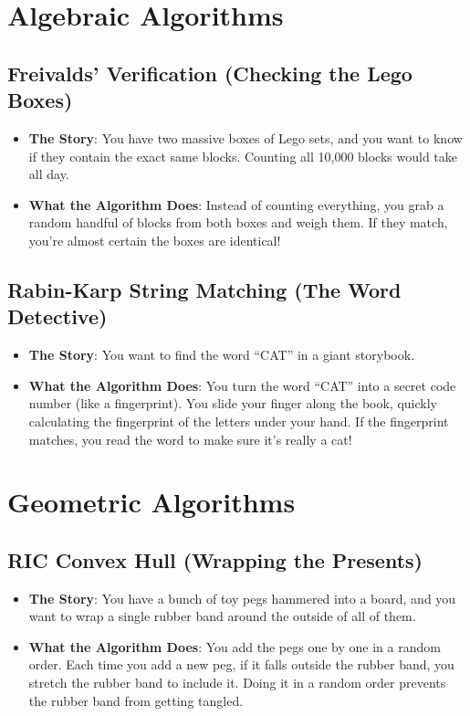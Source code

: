 \documentclass[twoside,12pt]{book}
\theoremstyle{plain}
\theoremstyle{definition}
\theoremstyle{remark}
\begin{document}
\section{Algebraic Algorithms}

\subsection{Freivalds' Verification (Checking the Lego Boxes)}
\begin{itemize}
    \item \textbf{The Story}: You have two massive boxes of Lego sets, and you want to know if they contain the exact same blocks. Counting all 10,000 blocks would take all day.
    \item \textbf{What the Algorithm Does}: Instead of counting everything, you grab a random handful of blocks from both boxes and weigh them. If they match, you're almost certain the boxes are identical!
\end{itemize}

\subsection{Rabin-Karp String Matching (The Word Detective)}
\begin{itemize}
    \item \textbf{The Story}: You want to find the word ``CAT'' in a giant storybook.
    \item \textbf{What the Algorithm Does}: You turn the word ``CAT'' into a secret code number (like a fingerprint). You slide your finger along the book, quickly calculating the fingerprint of the letters under your hand. If the fingerprint matches, you read the word to make sure it's really a cat!
\end{itemize}

\section{Geometric Algorithms}

\subsection{RIC Convex Hull (Wrapping the Presents)}
\begin{itemize}
    \item \textbf{The Story}: You have a bunch of toy pegs hammered into a board, and you want to wrap a single rubber band around the outside of all of them.
    \item \textbf{What the Algorithm Does}: You add the pegs one by one in a random order. Each time you add a new peg, if it falls outside the rubber band, you stretch the rubber band to include it. Doing it in a random order prevents the rubber band from getting tangled.
\end{itemize}
\end{document}
